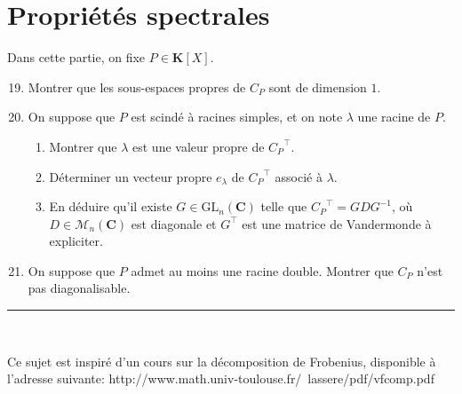 \documentclass[a4paper,11pt]{article}
\newcommand{\C}{\mathbf{C}}
\newcommand{\K}{\mathbf{K}}
\newcommand{\M}{\mathcal{M}}
\newcommand{\fin}{
	\begin{center}
	\vspace*{2em}
	{\color{vert1}\rule{5cm}{0.2pt}}\\
	\vspace*{1em}
			\sffamily\bfseries{\color{vert1}{FIN DU SUJET}}
	\end{center}
	}
\begin{document}
\section{Propriétés spectrales}
Dans cette partie, on fixe $P\in\K[X]$.
\begin{enumerate}
\setcounter{enumi}{18}
\item Montrer que les sous-espaces propres de $C_P$ sont de dimension $1$.
\item On suppose que $P$ est scindé à racines simples, et on note $\lambda$ une racine de $P$.
\begin{enumerate}
\item Montrer que $\lambda$ est une valeur propre de ${C_P}^\top$.
\item Déterminer un vecteur propre $e_\lambda$ de ${C_P}^\top$ associé à $\lambda$.
\item En déduire qu'il existe $G\in\mathrm{GL}_n(\C)$ telle que ${C_P}^\top=GDG^{-1}$, où $D\in\M_n(\C)$ est diagonale et $G^\top$ est une matrice de Vandermonde à expliciter.
\end{enumerate}
\item On suppose que $P$ admet au moins une racine double. Montrer que $C_P$ n'est pas diagonalisable.
\end{enumerate}

\fin
\vspace*{\fill}
\begin{tiny}
Ce sujet est inspiré d'un cours sur la décomposition de Frobenius, disponible à l'adresse suivante: http://www.math.univ-toulouse.fr/~lassere/pdf/vfcomp.pdf
\end{tiny}
\end{document}
